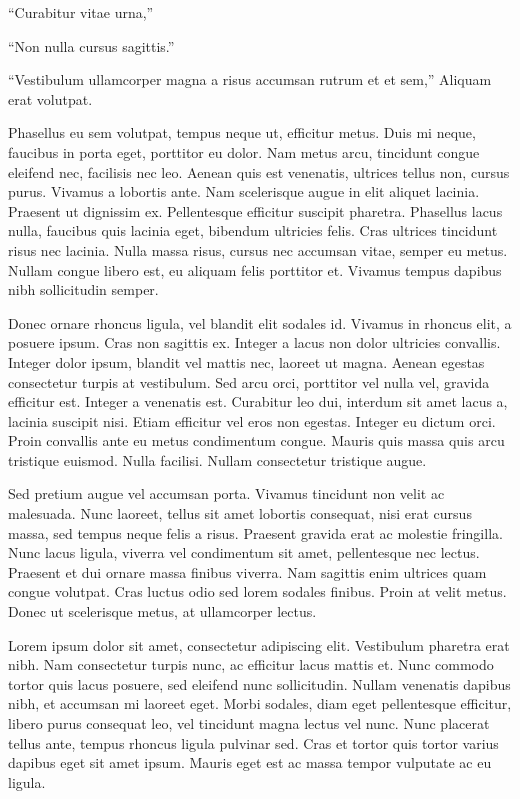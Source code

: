 \documentclass[a4paper]{memoir}
\begin{document}
“Curabitur vitae urna,”

“Non nulla cursus sagittis.”

“Vestibulum ullamcorper magna a risus accumsan rutrum et et sem,” Aliquam erat volutpat. 

Phasellus eu sem volutpat, tempus neque ut, efficitur metus. Duis mi neque, faucibus in porta eget, porttitor eu dolor. Nam metus arcu, tincidunt congue eleifend nec, facilisis nec leo. Aenean quis est venenatis, ultrices tellus non, cursus purus. Vivamus a lobortis ante. Nam scelerisque augue in elit aliquet lacinia. Praesent ut dignissim ex. Pellentesque efficitur suscipit pharetra. Phasellus lacus nulla, faucibus quis lacinia eget, bibendum ultricies felis. Cras ultrices tincidunt risus nec lacinia. Nulla massa risus, cursus nec accumsan vitae, semper eu metus. Nullam congue libero est, eu aliquam felis porttitor et. Vivamus tempus dapibus nibh sollicitudin semper. 

Donec ornare rhoncus ligula, vel blandit elit sodales id. Vivamus in rhoncus elit, a posuere ipsum. Cras non sagittis ex. Integer a lacus non dolor ultricies convallis. Integer dolor ipsum, blandit vel mattis nec, laoreet ut magna. Aenean egestas consectetur turpis at vestibulum. Sed arcu orci, porttitor vel nulla vel, gravida efficitur est. Integer a venenatis est. Curabitur leo dui, interdum sit amet lacus a, lacinia suscipit nisi. Etiam efficitur vel eros non egestas. Integer eu dictum orci. Proin convallis ante eu metus condimentum congue. Mauris quis massa quis arcu tristique euismod. Nulla facilisi. Nullam consectetur tristique augue. 

Sed pretium augue vel accumsan porta. Vivamus tincidunt non velit ac malesuada. Nunc laoreet, tellus sit amet lobortis consequat, nisi erat cursus massa, sed tempus neque felis a risus. Praesent gravida erat ac molestie fringilla. Nunc lacus ligula, viverra vel condimentum sit amet, pellentesque nec lectus. Praesent et dui ornare massa finibus viverra. Nam sagittis enim ultrices quam congue volutpat. Cras luctus odio sed lorem sodales finibus. Proin at velit metus. Donec ut scelerisque metus, at ullamcorper lectus. 

Lorem ipsum dolor sit amet, consectetur adipiscing elit. Vestibulum pharetra erat nibh. Nam consectetur turpis nunc, ac efficitur lacus mattis et. Nunc commodo tortor quis lacus posuere, sed eleifend nunc sollicitudin. Nullam venenatis dapibus nibh, et accumsan mi laoreet eget. Morbi sodales, diam eget pellentesque efficitur, libero purus consequat leo, vel tincidunt magna lectus vel nunc. Nunc placerat tellus ante, tempus rhoncus ligula pulvinar sed. Cras et tortor quis tortor varius dapibus eget sit amet ipsum. Mauris eget est ac massa tempor vulputate ac eu ligula. 
\end{document}
